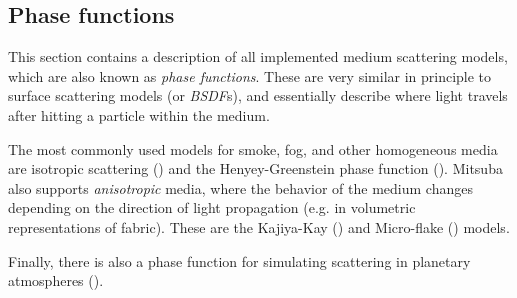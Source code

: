 \newpage
\subsection{Phase functions}
\label{sec:phase}
This section contains a description of all implemented medium scattering models, which
are also known as \emph{phase functions}. These are very similar in principle to surface
scattering models (or \emph{BSDF}s), and essentially describe where light travels after
hitting a particle within the medium.

The most commonly used models for smoke, fog, and other homogeneous media
are isotropic scattering () and the Henyey-Greenstein
phase function (). Mitsuba also supports \emph{anisotropic}
media, where the behavior of the medium changes depending on the direction
of light propagation (e.g. in volumetric representations of fabric). These
are the Kajiya-Kay () and Micro-flake ()
models.

Finally, there is also a phase function for simulating scattering in
planetary atmospheres ().
